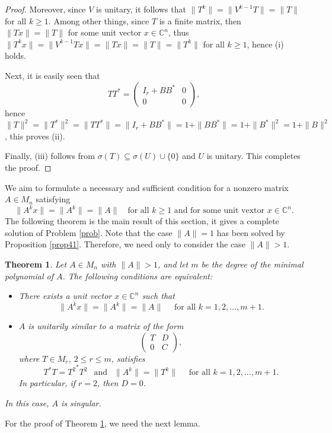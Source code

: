 \documentclass[11pt]{article}
\newtheorem{theorem}{Theorem}[section]
\numberwithin{equation}{section}
\def\IC{{\mathbb C}}
\begin{document}
\begin{proof}
Moreover, since $V$ is unitary, it follows that $\|T^k\|=\|V^{k-1}T\|=\|T\|$ for all $k\ge1$. Among
other things, since $T$ is a finite matrix, then $\|Tx\|=\|T\|$ for some unit vector $x\in\IC^n$,
thus $\|T^kx\|=\|V^{k-1}Tx\|=\|Tx\|=\|T\|=\|T^k\|$ for all $k\ge 1$, hence (i) holds.

Next, it is easily seen that
$$
TT^*=\begin{pmatrix}
I_r+BB^* & 0\\
0 & 0
\end{pmatrix},$$
hence $\|T\|^2=\|T^*\|^2=\|TT^*\|=\|I_r+BB^*\|=1+\|BB^*\|=1+\|B^*\|^2=1+\|B\|^2$, this proves (ii).

Finally, (iii) follows from $\sigma(T)\subseteq\sigma(U)\cup\{0\}$ and $U$ is unitary. This completes the proof.
\end{proof}


We aim to formulate a necessary and sufficient condition for a nonzero matrix
$A\in M_n$  satisfying
\[
\|A^k x\| = \|A^k\| = \|A\|  \quad \text{for all } k \ge 1 \mbox{ and for some unit vextor } x\in\IC^n.
\]
The following theorem is the main result of this section, it gives a complete solution of Problem \ref{prob}. Note that the case $\|A\|=1$ has been solved by Proposition \ref{prop41}. Therefore, we need only to consider the case $\|A\|>1$.

\begin{theorem}\label{t44}
Let $A\in M_n$ with $\|A\|>1$, and let $m$ be the degree of the minimal polynomial of $A$.
The following conditions are equivalent:
\begin{itemize}
\item[\rm (a)] There exists a unit vector $x\in \mathbb{C}^n$ such that
\[
\|A^k x\| = \|A^k\| = \|A\|  \quad \mbox{ for all } k = 1,2,\ldots,m+1.
\]

\item[\rm (b)] $A$ is unitarily similar to a matrix of the form
\[
\begin{pmatrix}
T & D\\
0 & C
\end{pmatrix},
\]
where $T\in M_r$, $2 \le r \le m$, satisfies
\[
T^*T = {T^2}^*T^2 \ \ \mbox{ and } \ \
\|A^k\| = \|T^k\| \quad \mbox{ for all }  k = 1,2,\ldots,m+1.
\]
In particular, if $r=2$, then $D=0$.
\end{itemize}
In this case, $A$ is singular.
\end{theorem}



For the proof of Theorem \ref{t44}, we need the next lemma.
\end{document}
